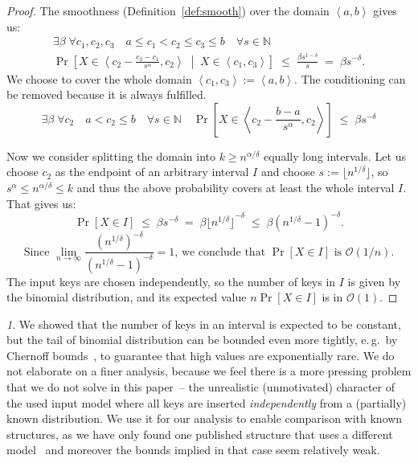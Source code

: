 \documentclass[
submission
]{dmtcs-episciences}
\theoremstyle{plain}
\theoremstyle{definition}
\theoremstyle{remark}
\newtheorem*{rem*}{\protect\remarkname}
\theoremstyle{plain}
\theoremstyle{plain}
\providecommand{\remarkname}{Remark}
\def\interval#1#2{\left\langle#1,#2\right\rangle}
\def\eqspaces{\;=\;}
\def\lespaces{\;\le\;}
\def\Prob#1{\Pr\!\left[#1\right]}
\def\OO{\mathcal O}
\def\natural{\mathbb{N}}
\begin{document}
\begin{proof}

The smoothness (Definition~\ref{def:smooth}) over the domain $\interval a b$ gives us:
\begin{multline*}
	\exists\beta \; \forall c_1,c_2,c_3 \quad a \le c_1 < c_2 \le c_3 \le b \quad \forall s \in \natural \\
		\Prob{  X \in \interval{ c_2 - \frac{c_3-c_1}{s^\alpha} }{c_2} \; \middle| \; X \in \interval{c_1}{c_3}  }
		\lespaces \frac{\beta s^{1-\delta}}{s}  \eqspaces  \beta s^{-\delta}.
\end{multline*}
We choose to cover the whole domain $\interval{c_1}{c_3} := \interval a b$. The conditioning can be removed because it is always fulfilled.
\[
	\exists\beta \; \forall c_2 \quad a < c_2 \le b \quad \forall s \in \natural \quad
		\Prob{  X \in \interval{ c_2 - \frac{b-a}{s^\alpha} }{c_2}  }
		\lespaces \beta s^{-\delta}
\]

Now we consider splitting the domain into $k \ge n^{\alpha / \delta}$ equally long intervals.
Let us choose $c_2$ as the endpoint of an arbitrary
interval $I$ and choose $s:= \lfloor n^{1 / \delta} \rfloor$, so
$ s^\alpha \le n^{\alpha / \delta} \le k $ and thus the above probability covers at least the whole interval $I$. That gives us:
\[	\Prob{X \in I} \lespaces \beta s^{-\delta}
	\eqspaces \beta {\lfloor n^{1 / \delta} \rfloor}^{-\delta}
	\lespaces \beta \left( n^{1 / \delta} - 1 \right) ^{-\delta}.
\] \[
\text{Since } \lim_{n \to \infty}
	\frac{ ( n^{1 / \delta} ) ^{-\delta} }{ ( n^{1 / \delta} - 1 ) ^{-\delta} }
	= 1 \text{, we conclude that } \Prob{X \in I} \text{ is } \OO(1/n).
\]
%
The input keys are chosen independently, so the number of keys in $I$ is given by the binomial distribution, and its expected value
$n \Prob{X \in I}$ is in $\OO(1)$.
\end{proof}

\begin{rem*}
We showed that the number of keys in an interval is expected to be constant, but the tail of binomial distribution can be bounded even more tightly, e.\,g.~by Chernoff bounds~\cite[chapter~4.1]{randomAlgs}, to guarantee that high values are exponentially rare.
We do not elaborate on a finer analysis, because we feel there is a more pressing problem that we do not solve in this paper~-- the unrealistic (unmotivated) character of the used input model where all keys are inserted \emph{independently} from a (partially) known distribution.
We use it for our analysis to enable comparison with known structures, as we have only found one published structure that uses a different model~\cite{DemaineJP04} and moreover the bounds implied in that case seem relatively weak.
\end{rem*}
\end{document}
